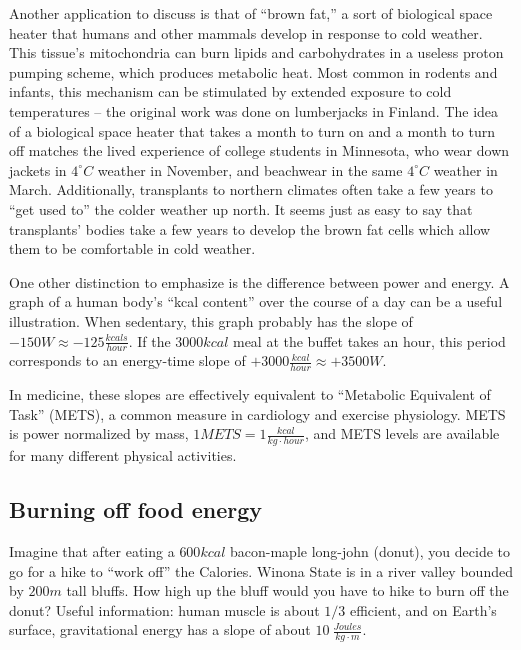 \documentclass[prb,preprint]{revtex4-2}
\newcommand{\degC}{^{\circ}C}
\begin{document}
Another application to discuss is that of ``brown fat,'' a sort of biological space heater that humans and other mammals develop in response to cold weather.  This tissue's mitochondria can burn lipids and carbohydrates in a useless proton pumping scheme, which produces metabolic heat.\cite{brown_fat_1,brown_fat_2,brown_fat_3,brown_fat_4}  Most common in rodents and infants, this mechanism can be stimulated by extended exposure to cold temperatures -- the original work was done on lumberjacks in Finland.\cite{finland_lumberjacks}  
The idea of a biological space heater that takes a month to turn on and a month to turn off matches the lived experience of college students in Minnesota, who wear down jackets in $4\degC$ weather in November, and beachwear in the same $4\degC$ weather in March.  Additionally, transplants to northern climates often take a few years to ``get used to'' the colder weather up north. It seems just as easy to say that transplants' bodies take a few years to develop the brown fat cells which allow them to be comfortable in cold weather.

One other distinction to emphasize is the difference between power and energy.  A graph of a human body's ``kcal content'' over the course of a day can be a useful illustration.  When sedentary, this graph probably has the slope of $-150W\approx -125 \frac{kcals}{hour}$.  If the $3000kcal$ meal at the buffet takes an hour, this period corresponds to an energy-time slope of 
$+3000\frac{kcal}{hour}\approx +3500W$.  

In medicine, these slopes are effectively equivalent to ``Metabolic Equivalent of Task'' (METS), a common measure in cardiology and exercise physiology.  METS is power normalized by mass, $1METS=1\frac{kcal}{kg\cdot hour}$, and METS levels are available for many different physical activities.\cite{METS}

\subsection{Burning off food energy}
Imagine that after eating a $600kcal$ bacon-maple long-john (donut), you decide to go for a hike to ``work off'' the Calories.  
Winona 
State  is in a river valley bounded by $200m$ tall bluffs.  How high up the bluff would you have to hike to burn off the donut?  
Useful information: human muscle is about $1/3$ efficient, and on Earth's surface, gravitational energy has a slope of about $10~\frac{Joules}{kg\cdot m}$.
\end{document}
